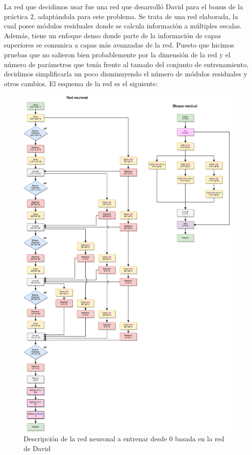 \documentclass[11pt,a4paper]{article}
\theoremstyle{definition}
\begin{document}
La red que decidimos usar fue una red que desarrolló David para el bonus de la práctica 2, adaptándola para este problema. Se trata de una red elaborada, la cual posee módulos residuales donde se calcula información a múltiples escalas. Además,  tiene un enfoque denso donde parte de la información de capas superiores se comunica a capas más avanzadas de la red.  Puesto que hicimos pruebas que no salieron bien probablemente por la dimensión de la red y el número de parámetros que tenía frente al tamaño del conjunto de entrenamiento, decidimos simplificarla un poco disminuyendo el número de módulos residuales y otros cambios. El esquema de la red es el siguiente:

\begin{figure}[H]
  \centering
    \includegraphics[scale=0.5]{./images/ScratchDavid.png}
	\caption{Descripción de la red neuronal a entrenar desde 0 basada en la red de David}

\end{figure}
\end{document}
